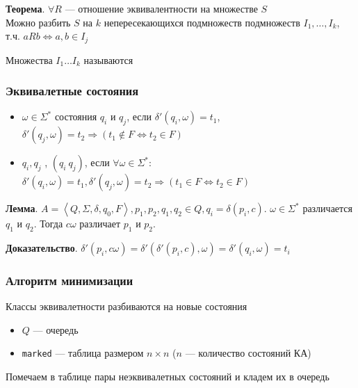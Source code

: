 \documentclass[a4paper, 14pt]{extarticle}
\begin{document}
\begin{tcolorbox}
    \textbf{Теорема}. $\forall R$ --- отношение эквивалентности на множестве $S$\\
    Можно разбить $S$ на $k$ непересекающихся подмножеств подмножеств $I_1, \ldots, I_k$, т.ч. $aRb \Leftrightarrow a, b \in I_j$
\end{tcolorbox}
Множества $I_1 \ldots I_k$ называются 

\subsubsection{Эквивалетные состояния}
\begin{itemize}
    \item $\omega \in \Sigma^*$  состояния $q_i$ и $q_j$, если $\delta'(q_i, \omega) = t_1$, $\delta'(q_j, \omega) = t_2 \Rightarrow (t_1 \notin F \Leftrightarrow t_2 \in F )$
    \item $q_i, q_j$ , $(q_i ~ q_j)$, если $\forall \omega \in \Sigma^*$: $\delta'(q_i, \omega) = t_1, \delta'(q_j, \omega) = t_2 \Rightarrow (t_1 \in F \Leftrightarrow t_2 \in F)$
\end{itemize}

\begin{tcolorbox}
    \textbf{Лемма}. $A = \left\langle Q, \Sigma, \delta, q_0, F \right\rangle, p_1, p_2, q_1, q_2 \in Q, q_i = \delta(p_i, c) $. $ \omega \in \Sigma^* $ различается $q_1$ и $q_2$. Тогда $c\omega$ различает $p_1$ и $p_2$.
\end{tcolorbox}

\begin{tcolorbox}
    \textbf{Доказательство}. $ \delta'(p_i, c \omega) = \delta'( \delta'(p_i, c), \omega ) = \delta'(q_i, \omega) = t_i $ 
\end{tcolorbox}

\subsubsection{Алгоритм минимизации}
Классы эквивалетности разбиваются на новые состояния

\begin{itemize}
    \item $Q$ --- очередь
    \item \texttt{marked} --- таблица размером $n \times n$ ($n$ --- количество состояний КА)
\end{itemize}

Помечаем в таблице пары неэквивалетных состояний и кладем их в очередь
\end{document}

